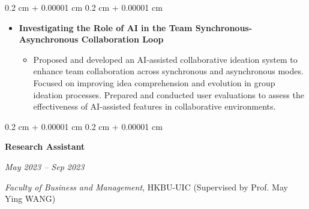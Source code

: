 \documentclass[10pt, letterpaper]{article}
\newenvironment{highlights}{
    \begin{itemize}[
        topsep=0.10 cm,
        parsep=0.10 cm,
        partopsep=0pt,
        itemsep=0pt,
        leftmargin=0.4 cm + 10pt
    ]
}{
    \end{itemize}
} %
\newenvironment{onecolentry}{
    \begin{adjustwidth}{
        0.2 cm + 0.00001 cm
    }{
        0.2 cm + 0.00001 cm
    }
}{
    \end{adjustwidth}
} %
\newenvironment{twocolentry}[2][]{
    \onecolentry
    \def\secondColumn{#2}
    \setcolumnwidth{\fill, 4.5 cm}
    \begin{paracol}{2}
}{
    \switchcolumn \raggedleft \secondColumn
    \end{paracol}
    \endonecolentry
} %
\begin{document}
\begin{onecolentry}
\begin{highlights}
\begin{itemize}
                \end{itemize}
                \item \textbf{Investigating the Role of AI in the Team Synchronous-Asynchronous Collaboration Loop}
                \begin{itemize}
                    \item Proposed and developed an AI-assisted collaborative ideation system to enhance team collaboration across synchronous and asynchronous modes. Focused on improving idea comprehension and evolution in group ideation processes. Prepared and conducted user evaluations to assess the effectiveness of AI-assisted features in collaborative environments.
                \end{itemize}
            \end{highlights}
        \end{onecolentry}





        \begin{twocolentry}{
            \textit{May 2023 – Sep 2023}}
                \textbf{Research Assistant}   
        \end{twocolentry}
        \hspace{0.2cm}\textit{Faculty of Business and Management}, HKBU-UIC (Supervised by Prof. May Ying WANG)
\end{document}
